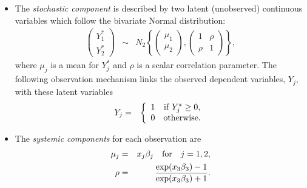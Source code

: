 \begin{itemize}
\item The \emph{stochastic component} is described by two latent (unobserved)
  continuous variables which follow the bivariate Normal distribution:
\begin{eqnarray*}
  \left ( \begin{array}{c} 
      Y_1^* \\
      Y_2^* 
    \end{array}
  \right ) &\sim &  
  N_2 \left \{ \left ( 
      \begin{array}{c}
        \mu_1 \\ \mu_2
      \end{array} \right ), \left( \begin{array}{cc}
                 1 & \rho \\
                 \rho & 1 
                 \end{array} \right) \right\},
\end{eqnarray*}
where $\mu_j$ is a mean for $Y_j^*$ and $\rho$ is a scalar correlation
parameter. The following observation mechanism links the observed
dependent variables, $Y_j$, with these latent variables
\begin{eqnarray*}
Y_j & = & \left \{ \begin{array}{cc}
                   1 & {\rm if} \; Y_j^* \ge 0, \\
                   0 & {\rm otherwise.}
                   \end{array} 
                   \right.
\end{eqnarray*}


\item The \emph{systemic components} for each observation are 
  \begin{eqnarray*}
    \mu_j & = & x_{j} \beta_j \quad {\rm for} \quad j=1,2, \\
    \rho & = & \frac{\exp(x_3 \beta_3) - 1}{\exp(x_3 \beta_3) + 1}.
\end{eqnarray*}

\end{itemize}

